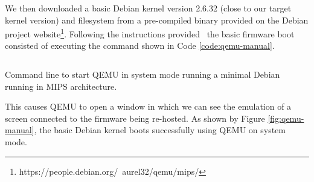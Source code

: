 We then downloaded a basic Debian kernel version 2.6.32 (close to our target kernel version) and filesystem from a pre-compiled binary provided on the Debian project website\footnote{https://people.debian.org/~aurel32/qemu/mips/}. Following the instructions provided~\cite{victor-sales} the basic firmware boot consisted of executing the command shown in Code \ref{code:qemu-manual}.

\begin{listing}[!ht]
\inputminted[fontsize=\footnotesize,breaklines]{text}{Code/qemu-manual}
\caption{Command line to start QEMU in system mode running a minimal Debian running in MIPS architecture.}
\label{code:qemu-manual}
\end{listing}

This causes QEMU to open a window in which we can see the emulation of a screen connected to the firmware being re-hosted. As shown by Figure \ref{fig:qemu-manual}, the basic Debian kernel boots successfully using QEMU on system mode.

